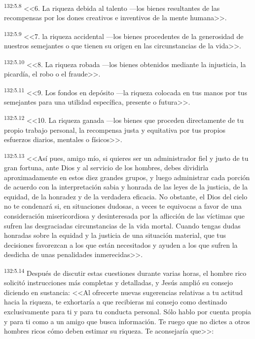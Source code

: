 \par 
\textsuperscript{132:5.8} <<6. La riqueza debida al talento ---los bienes resultantes de las recompensas por los dones creativos e inventivos de la mente humana>>.

\par 
\textsuperscript{132:5.9} <<7. la riqueza accidental ---los bienes procedentes de la generosidad de nuestros semejantes o que tienen su origen en las circunstancias de la vida>>.

\par 
\textsuperscript{132:5.10} <<8. La riqueza robada ---los bienes obtenidos mediante la injusticia, la picardía, el robo o el fraude>>.

\par 
\textsuperscript{132:5.11} <<9. Los fondos en depósito ---la riqueza colocada en tus manos por tus semejantes para una utilidad específica, presente o futura>>.

\par 
\textsuperscript{132:5.12} <<10. La riqueza ganada ---los bienes que proceden directamente de tu propio trabajo personal, la recompensa justa y equitativa por tus propios esfuerzos diarios, mentales o físicos>>.

\par 
\textsuperscript{132:5.13} <<Así pues, amigo mío, si quieres ser un administrador fiel y justo de tu gran fortuna, ante Dios y al servicio de los hombres, debes dividirla aproximadamente en estos diez grandes grupos, y luego administrar cada porción de acuerdo con la interpretación sabia y honrada de las leyes de la justicia, de la equidad, de la honradez y de la verdadera eficacia. No obstante, el Dios del cielo no te condenará si, en situaciones dudosas, a veces te equivocas a favor de una consideración misericordiosa y desinteresada por la aflicción de las víctimas que sufren las desgraciadas circunstancias de la vida mortal. Cuando tengas dudas honradas sobre la equidad y la justicia de una situación material, que tus decisiones favorezcan a los que están necesitados y ayuden a los que sufren la desdicha de unas penalidades inmerecidas>>.

\par 
\textsuperscript{132:5.14} Después de discutir estas cuestiones durante varias horas, el hombre rico solicitó instrucciones más completas y detalladas, y Jesús amplió su consejo diciendo en sustancia: <<Al ofrecerte nuevas sugerencias relativas a tu actitud hacia la riqueza, te exhortaría a que recibieras mi consejo como destinado exclusivamente para ti y para tu conducta personal. Sólo hablo por cuenta propia y para ti como a un amigo que busca información. Te ruego que no dictes a otros hombres ricos cómo deben estimar su riqueza. Te aconsejaría que>>:

